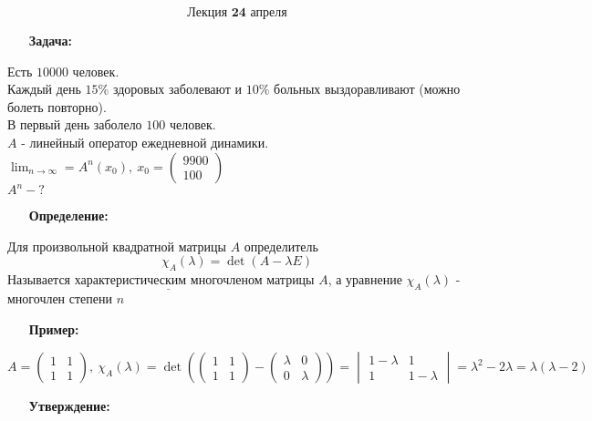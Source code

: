 \documentclass[12pt, letterpaper, twoside]{article}
\newcommand{\Underl}[1]{$\underline{\text{#1}}$}
\newcommand{\DS}{\displaystyle}
\newcommand{\oo}{\infty}
\begin{document}
        \[\textbf{Лекция 24 апреля}\]
        \begin{enumerate}
            \item[\textbf{Задача:}]
        \end{enumerate}
        Есть $10000$ человек.\\
        Каждый день $15\%$ здоровых заболевают и $10\%$ больных выздоравливают (можно болеть повторно).\\
        В первый день заболело $100$ человек.\\
        $A$ - линейный оператор ежедневной динамики.\\
        $\DS\lim_{n\rightarrow \oo} = A^n(x_0),\ x_0 = \begin{pmatrix}
            9900\\
            100
        \end{pmatrix}$\\
        $A^n-?$
        \begin{enumerate}
            \item[\textbf{Определение:}]
        \end{enumerate}
        Для произвольной квадратной матрицы $A$ определитель
        \[\chi_A (\lambda) = \det(A-\lambda E) \]
        Называется \Underl{характеристическим многочленом} матрицы $A$, а уравнение $\chi_A(\lambda)$ - многочлен степени $n$
        \begin{enumerate}
            \item[\textbf{Пример:}]
        \end{enumerate}
        $A = \begin{pmatrix}
            1 & 1\\
            1 & 1
        \end{pmatrix},\ \chi_A(\lambda) = \det\left(\begin{pmatrix}
            1 & 1\\
            1 & 1
        \end{pmatrix} - \begin{pmatrix}
            \lambda & 0\\
            0 & \lambda
        \end{pmatrix} \right) = \begin{vmatrix}
            1 - \lambda & 1\\
            1 & 1 - \lambda
        \end{vmatrix} = \lambda^2 - 2\lambda = \lambda(\lambda - 2)$
        \begin{enumerate}
            \item[\textbf{Утверждение:}]
        \end{enumerate}
\end{document}
